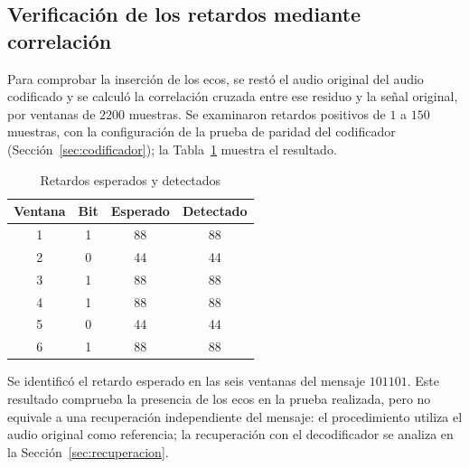\subsection{Verificación de los retardos mediante correlación}
Para comprobar la inserción de los ecos, se restó el audio original del audio codificado y se calculó la correlación cruzada entre ese residuo y la señal original, por ventanas de $2200$ muestras. Se examinaron retardos positivos de $1$ a $150$ muestras, con la configuración de la prueba de paridad del codificador (Sección~\ref{sec:codificador}); la Tabla~\ref{tab:retardos} muestra el resultado.

\begin{table}[htbp]
\caption{Retardos esperados y detectados}
\label{tab:retardos}
\centering
\begin{tabular}{cccc}
\hline
Ventana & Bit & Esperado & Detectado \\
\hline
1 & 1 & 88 & 88 \\
2 & 0 & 44 & 44 \\
3 & 1 & 88 & 88 \\
4 & 1 & 88 & 88 \\
5 & 0 & 44 & 44 \\
6 & 1 & 88 & 88 \\
\hline
\end{tabular}
\end{table}

Se identificó el retardo esperado en las seis ventanas del mensaje $101101$. Este resultado comprueba la presencia de los ecos en la prueba realizada, pero no equivale a una recuperación independiente del mensaje: el procedimiento utiliza el audio original como referencia; la recuperación con el decodificador se analiza en la Sección~\ref{sec:recuperacion}.
